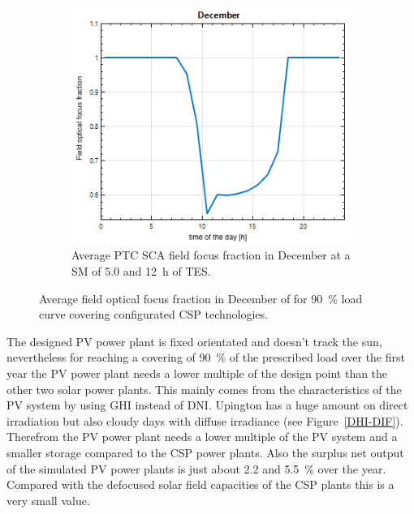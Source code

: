 \begin{figure}[!htbp]
\begin{subfigure}[b]{0.5\textwidth}
                \includegraphics[width=1\textwidth]{FIG/FocusFraction/DecemberPTC}
                \caption{Average PTC SCA field focus fraction in December at a SM of 5.0 and 12~h of TES.}\label{DecemberPTC}
        \end{subfigure}
        \caption[Average field optical focus fraction in December of for 90~\% load curve covering configurated CSP technologies.]{Average field optical focus fraction in December of for 90~\% load curve covering configurated CSP technologies.}\label{FocusFraction}
\end{figure}

The designed PV power plant is fixed orientated and doesn't track the sun, nevertheless for reaching a covering of 90~\% of the prescribed load over the first year the PV power plant needs a lower multiple of the design point than the other two solar power plants. This mainly comes from the characteristics of the PV system by using GHI instead of DNI. Upington has a huge amount on direct irradiation but also cloudy days with diffuse irradiance (see Figure~\ref{DHI-DIF}). Therefrom the PV power plant needs a lower multiple of the PV system and a smaller storage compared to the CSP power plants. Also the surplus net output of the simulated PV power plants is just about 2.2 and 5.5~\% over the year. Compared with the defocused solar field capacities of the CSP plants this is a very small value.

